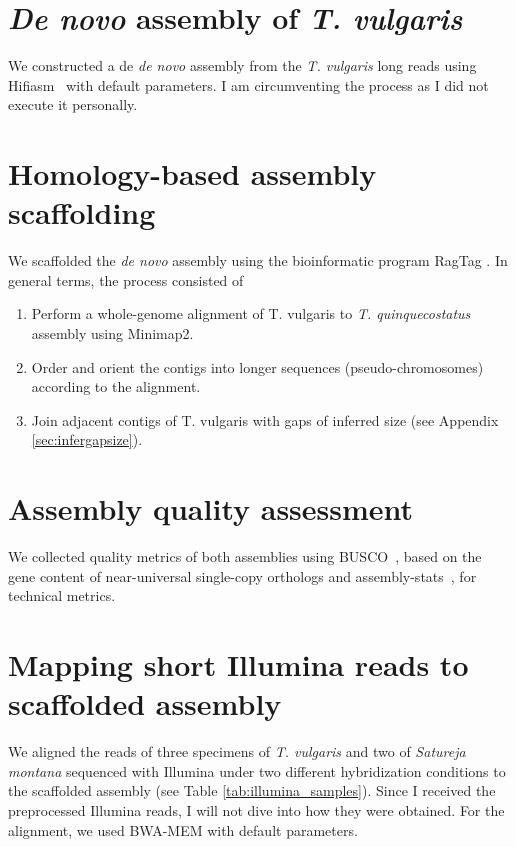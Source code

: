 \section{\textit{De novo} assembly of \textit{T. vulgaris}}

We constructed a de \textit{de novo} assembly from the \textit{T. vulgaris} long reads using Hifiasm~\cite{chengHaplotyperesolvedNovoAssembly2021} with default parameters. I am circumventing the process as I did not execute it personally.
        
\section{Homology-based assembly scaffolding}

We scaffolded the \textit{de novo} assembly using the bioinformatic program RagTag \cite{alongeAutomatedAssemblyScaffolding2022}. In general terms, the process consisted of 
\begin{enumerate}
    \item Perform a whole-genome alignment of T. vulgaris to \textit{T. quinquecostatus} assembly using Minimap2. 
    \item Order and orient the contigs into longer sequences (pseudo-chromosomes) according to the alignment. 
    \item Join adjacent contigs of T. vulgaris with gaps of inferred size (see Appendix \ref{sec:infergapsize}). 
\end{enumerate}

\section{Assembly quality assessment}

We collected quality metrics of both assemblies using BUSCO~\cite{manniBUSCOAssessingGenomic2021}, based on the gene content of near-universal single-copy orthologs and assembly-stats~\cite{Assemblystats2023}, for technical metrics. 

\section{Mapping short Illumina reads to scaffolded assembly}\label{sec:illumina}

We aligned the reads of three specimens of \textit{T. vulgaris} and two of \textit{Satureja montana} sequenced with Illumina under two different hybridization conditions to the scaffolded assembly (see Table \ref{tab:illumina_samples}). Since I received the preprocessed Illumina reads, I will not dive into how they were obtained. For the alignment, we used BWA-MEM with default parameters. 

